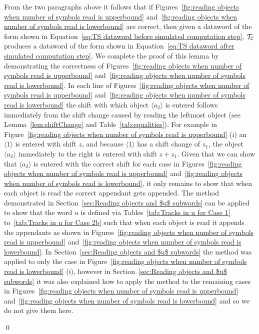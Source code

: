 \documentclass[11pt]{article} \usepackage{amsfonts,amsmath,amssymb,amsthm}
\renewenvironment{proof}{{\bfseries\noindent Proof.}}{\qed\vspace{3.5ex}}
\newcommand{\tne}[1]{\ensuremath{\langle #1\rangle}}
\newcommand{\encodeOne}{\tne{1}}
\begin{document}
\begin{proof}
From the two paragraphs above it follows that if Figures~\ref{fig:reading objects when number of symbols read is upperbound} and~\ref{fig:reading objects when number of symbols read is lowerbound} are correct, then given a dataword of the form shown in Equation~\eqref{eq:TS dataword before simulated computation step}, $\mathcal{T_{\mathcal{C}}}$ produces a dataword of the form shown in Equation~\eqref{eq:TS dataword after simulated computation step}. 
We complete the proof of this lemma by demonstrating the correctness of Figures~\ref{fig:reading objects when number of symbols read is upperbound} and~\ref{fig:reading objects when number of symbols read is lowerbound}. 
In each line of Figures~\ref{fig:reading objects when number of symbols read is upperbound} and~\ref{fig:reading objects when number of symbols read is lowerbound} the shift with which object $\tne{a_2}$ is entered follows immediately from the shift change caused by reading the leftmost object (see Lemma~\ref{lem:shiftChange} and Table~\ref{tab:equalities}). 
For example in Figure~\ref{fig:reading objects when number of symbols read is upperbound} (i) an $\encodeOne$ is entered with shift $z$, and because $\encodeOne$ has a shift change of $z_1$, the object $\tne{a_2}$ immediately to the right is entered with shift $z+z_1$.
Given that we can show that $\tne{a_2}$ is entered with the correct shift for each case in Figures~\ref{fig:reading objects when number of symbols read is upperbound} and~\ref{fig:reading objects when number of symbols read is lowerbound}, it only remains to show that when each object is read the correct appendant gets appended. 
The method demonstrated in Section~\ref{sec:Reading objects and $u$ subwords} can be applied to show that the word $u$ is defined via Tables~\ref{tab:Tracks in u for Case 1} to~\ref{tab:Tracks in u for Case 2b} such that when each object is read it appends the appendants as shown in Figures~\ref{fig:reading objects when number of symbols read is upperbound} and~\ref{fig:reading objects when number of symbols read is lowerbound}. 
In Section~\ref{sec:Reading objects and $u$ subwords} the method was applied to only the case in Figure~\ref{fig:reading objects when number of symbols read is lowerbound} (i), however in Section~\ref{sec:Reading objects and $u$ subwords} it was also explained how to apply the method to the remaining cases in Figures~\ref{fig:reading objects when number of symbols read is upperbound} and~\ref{fig:reading objects when number of symbols read is lowerbound} and so we do not give them here. 


\end{proof}
\end{document}
